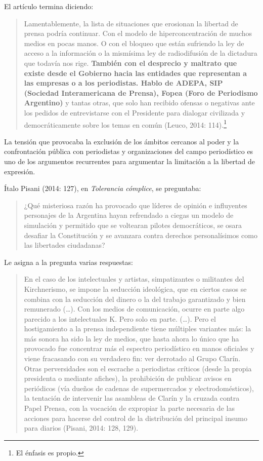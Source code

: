 El artículo termina diciendo:

\begin{quote}
Lamentablemente, la lista de situaciones que erosionan la libertad de prensa podría continuar. Con el modelo de hiperconcentración de muchos medios en pocas manos. O con el bloqueo que están sufriendo la ley de acceso a la información o la mismísima ley de radiodifusión de la dictadura que todavía nos rige. \textbf{También con el desprecio y maltrato que existe desde el Gobierno hacia las entidades que representan a las empresas o a los periodistas. Hablo de ADEPA, SIP (Sociedad Interamericana de Prensa), Fopea (Foro de Periodismo Argentino)} y tantas otras, que solo han recibido ofensas o negativas ante los pedidos de entrevistarse con el Presidente para dialogar civilizada y democráticamente sobre los temas en común (Leuco, 2014: 114).\footnote{El énfasis es propio.}
\end{quote}

La tensión que provocaba la exclusión de los ámbitos cercanos al poder y la confrontación pública con periodistas y organizaciones del campo periodístico es uno de los argumentos recurrentes para argumentar la limitación a la libertad de expresión.

Ítalo Pisani (2014: 127), en \emph{Tolerancia cómplice}, se preguntaba:

\begin{quote}
¿Qué misteriosa razón ha provocado que líderes de opinión e influyentes personajes de la Argentina hayan refrendado a ciegas un modelo de simulación y permitido que se voltearan pilotes democráticos, se osara desafiar la Constitución y se avanzara contra derechos personalísimos como las libertades ciudadanas?
\end{quote}

Le asigna a la pregunta varias respuestas:

\begin{quote}
En el caso de los intelectuales y artistas, simpatizantes o militantes del Kirchnerismo, se impone la seducción ideológica, que en ciertos casos se combina con la seducción del dinero o la del trabajo garantizado y bien remunerado (\ldots). Con los medios de comunicación, ocurre en parte algo parecido a los intelectuales K. Pero solo en parte. (\ldots). Pero el hostigamiento a la prensa independiente tiene múltiples variantes más: la más sonora ha sido la ley de medios, que hasta ahora lo único que ha provocado fue concentrar más el espectro periodístico en manos oficiales y viene fracasando con su verdadero fin: ver derrotado al Grupo Clarín. Otras perversidades son el escrache a periodistas críticos (desde la propia presidenta o mediante afiches), la prohibición de publicar avisos en periódicos (vía dueños de cadenas de supermercados y electrodomésticos), la tentación de intervenir las asambleas de Clarín y la cruzada contra Papel Prensa, con la vocación de expropiar la parte necesaria de las acciones para hacerse del control de la distribución del principal insumo para diarios (Pisani, 2014: 128, 129).
\end{quote}

